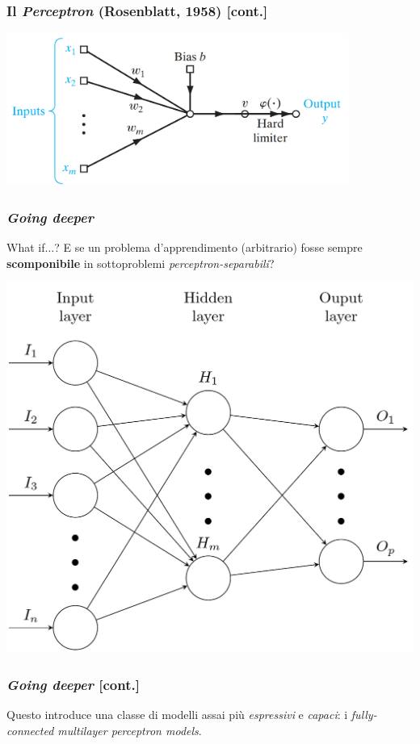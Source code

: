 \documentclass{beamer}
\begin{document}
{\begin{frame}
\end{frame}


\begin{frame}
	\frametitle{Il \textit{Perceptron} (Rosenblatt, 1958) [cont.]}
		\center \includegraphics[height=5cm, keepaspectratio]{perceptron.png}
\end{frame}


\begin{frame}
	\frametitle{\textit{Going deeper}}
		\begin{block}{What if$\dots$?}
			E se un problema d'apprendimento (arbitrario) fosse sempre \textbf{scomponibile} in sottoproblemi \textit{perceptron-separabili}?
	\end{block}
	\center \includegraphics[width=0.55\linewidth]{nnet-graph.png}
\end{frame}


\begin{frame}
	\frametitle{\textit{Going deeper} [cont.]}

	Questo introduce una classe di modelli assai più \textit{espressivi} e \textit{capaci}: i \textit{fully-connected multilayer perceptron models}.


\end{frame}}
\end{document}
